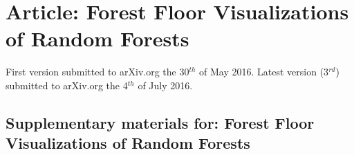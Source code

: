 \section{Article: Forest Floor Visualizations of Random Forests}
\label{article:forest}
First version submitted to arXiv.org the 30$^{th}$ of May 2016.
Latest version (3$^{rd}$) submitted to arXiv.org the 4$^{th}$ of July 2016.

\newpage


\subsection{Supplementary materials for: Forest Floor Visualizations of Random Forests}
\label{forestFloorSuppl}
